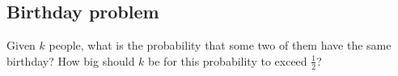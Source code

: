 

\setcounter{section}{3}
\setcounter{subsection}{0}
\setcounter{dfn}{11}

\subsection{Birthday problem}
Given $k$ people, what is the probability that some two of them have the same birthday?
How big should $k$ be for this probability to exceed $\frac12$?











